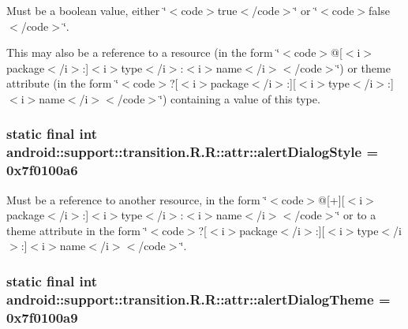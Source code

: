 Must be a boolean value, either \char`\"{}$<$code$>$true$<$/code$>$\char`\"{} or \char`\"{}$<$code$>$false$<$/code$>$\char`\"{}. 

This may also be a reference to a resource (in the form \char`\"{}$<$code$>$@\mbox{[}$<$i$>$package$<$/i$>$:\mbox{]}$<$i$>$type$<$/i$>$:$<$i$>$name$<$/i$>$$<$/code$>$\char`\"{}) or theme attribute (in the form \char`\"{}$<$code$>$?\mbox{[}$<$i$>$package$<$/i$>$:\mbox{]}\mbox{[}$<$i$>$type$<$/i$>$:\mbox{]}$<$i$>$name$<$/i$>$$<$/code$>$\char`\"{}) containing a value of this type. \hypertarget{classandroid_1_1support_1_1transition_1_1_r_1_1attr_94b0c050e565c3457815aa0b8b0c9fe7}{
\subsubsection[{alertDialogStyle}]{\setlength{\rightskip}{0pt plus 5cm}static final int android::support::transition.R.R::attr::alertDialogStyle = 0x7f0100a6}}
\label{classandroid_1_1support_1_1transition_1_1_r_1_1attr_94b0c050e565c3457815aa0b8b0c9fe7}


Must be a reference to another resource, in the form \char`\"{}$<$code$>$@\mbox{[}+\mbox{]}\mbox{[}$<$i$>$package$<$/i$>$:\mbox{]}$<$i$>$type$<$/i$>$:$<$i$>$name$<$/i$>$$<$/code$>$\char`\"{} or to a theme attribute in the form \char`\"{}$<$code$>$?\mbox{[}$<$i$>$package$<$/i$>$:\mbox{]}\mbox{[}$<$i$>$type$<$/i$>$:\mbox{]}$<$i$>$name$<$/i$>$$<$/code$>$\char`\"{}. \hypertarget{classandroid_1_1support_1_1transition_1_1_r_1_1attr_09ce7b25ce5ed91ee131d04e9b4e5412}{
\subsubsection[{alertDialogTheme}]{\setlength{\rightskip}{0pt plus 5cm}static final int android::support::transition.R.R::attr::alertDialogTheme = 0x7f0100a9}}
\label{classandroid_1_1support_1_1transition_1_1_r_1_1attr_09ce7b25ce5ed91ee131d04e9b4e5412}


